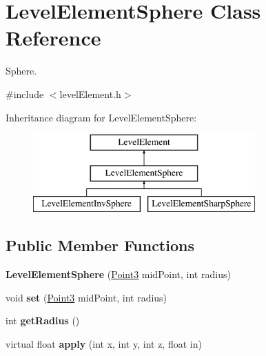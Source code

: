 \hypertarget{classLevelElementSphere}{
\section{\-Level\-Element\-Sphere \-Class \-Reference}
\label{d8/d73/classLevelElementSphere}
}


\-Sphere.  




{\ttfamily \#include $<$level\-Element.\-h$>$}

\-Inheritance diagram for \-Level\-Element\-Sphere\-:\begin{figure}[H]
\begin{center}
\leavevmode
\includegraphics[height=3.000000cm]{d8/d73/classLevelElementSphere}
\end{center}
\end{figure}
\subsection*{\-Public \-Member \-Functions}
\begin{DoxyCompactItemize}
\item 
\hypertarget{classLevelElementSphere_a6c230f0ef7a4168c5c0ff9f2f372f833}{
{\bfseries \-Level\-Element\-Sphere} (\hyperlink{classPoint3}{\-Point3} mid\-Point, int radius)}
\label{d8/d73/classLevelElementSphere_a6c230f0ef7a4168c5c0ff9f2f372f833}

\item 
\hypertarget{classLevelElementSphere_a99aedd90c04e50a67867bfcd88fd1ed7}{
void {\bfseries set} (\hyperlink{classPoint3}{\-Point3} mid\-Point, int radius)}
\label{d8/d73/classLevelElementSphere_a99aedd90c04e50a67867bfcd88fd1ed7}

\item 
\hypertarget{classLevelElementSphere_aa82205b985a5c752e2a8ca3c82df6018}{
int {\bfseries get\-Radius} ()}
\label{d8/d73/classLevelElementSphere_aa82205b985a5c752e2a8ca3c82df6018}

\item 
\hypertarget{classLevelElementSphere_a034128fa41c36392bd2b5a0dad2ff436}{
virtual float {\bfseries apply} (int x, int y, int z, float in)}
\label{d8/d73/classLevelElementSphere_a034128fa41c36392bd2b5a0dad2ff436}

\end{DoxyCompactItemize}
